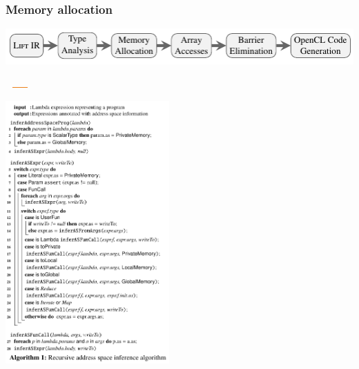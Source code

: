 \documentclass[10pt]{beamer}
\begin{document}
\begin{frame}[t]
\frametitle{Memory allocation}
    \vspace{-1cm}
    \begin{block}{}
        \begin{center}
            \includegraphics[width=1\textwidth]{../images/compilation_stages.pdf}
        \end{center}
        \vspace{-1.05cm}
        \hspace{3.36cm}
        \includegraphics[width=1.1cm, height=0.03cm]{../images/orange_bar.png}
        \vspace{.45cm}
    \end{block}
    \vspace{-1.7cm}
    \begin{block}{}
        \begin{center}
            \includegraphics[width=0.47\textwidth]{../images/address_space.pdf}
        \end{center}
    \end{block}
\end{frame}
\end{document}
